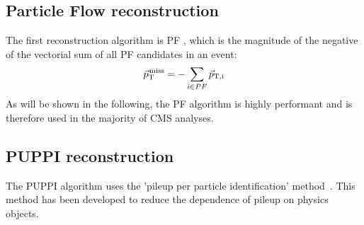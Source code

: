 \subsection{Particle Flow \ptmiss reconstruction}
The first reconstruction algorithm is PF \ptmiss, which is the magnitude of the negative of the vectorial sum of all PF candidates in an event:
\begin{equation}
{\vec p}_{\mathrm{T}}^{\kern1pt\text{miss}} =- \sum_{i\in PF} \vec{p}_{\mathrm{T, i}}
\label{eq:MET}
\end{equation}                                                                      
As will be shown in the following, the PF \ptmiss algorithm is highly performant and is therefore used in the majority of CMS analyses.
\subsection{PUPPI \ptmiss reconstruction}
The PUPPI \ptmiss algorithm uses the 'pileup per particle identification' method~\cite{Bertolini:2014bba}. This method has been developed to reduce the dependence of pileup on physics objects. 
